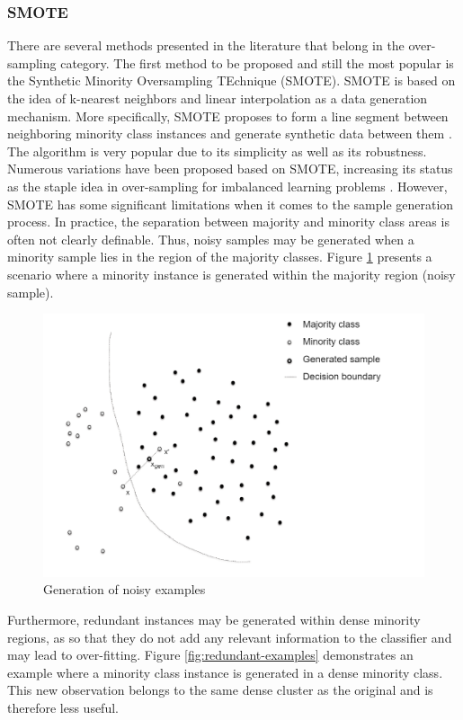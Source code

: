 \documentclass[parskip=full]{scrartcl}
\begin{document}
\subsubsection{SMOTE}

There are several methods presented in the literature that belong in the
over-sampling category. The first method to be  proposed and still the most
popular is the Synthetic Minority Oversampling TEchnique (SMOTE). SMOTE is based
on the idea of k-nearest neighbors and linear interpolation as a data generation
mechanism. More specifically, SMOTE proposes to form a line segment between
neighboring minority class instances and generate synthetic data between them
\cite{Chawla.2002}. The algorithm is very popular due to its simplicity as well
as its robustness. Numerous variations have been proposed based on SMOTE,
increasing its status as the staple idea in over-sampling for imbalanced
learning problems \cite{Fernandez.2018}. However, SMOTE has some significant
limitations when it comes to the sample generation process. In practice, the
separation between majority and minority class areas is often not clearly
definable. Thus, noisy samples may be generated when a minority sample lies in
the region of the majority classes. Figure \ref{fig:noisy-examples} presents a
scenario where a minority instance is generated within the majority region
(noisy sample).

\begin{figure}[H]
	\centering
	\includegraphics[width=0.6\linewidth]{../analysis/noisy_examples.png}
	\caption{Generation of noisy examples \cite{Douzas.2019}}
	\label{fig:noisy-examples}
\end{figure}

Furthermore, redundant instances may be generated within dense minority regions,
as so that they do not add any relevant information to the classifier and may
lead to over-fitting. Figure \ref{fig:redundant-examples} demonstrates an
example where a minority  class instance is generated in a dense minority class.
This new observation belongs to the same dense cluster as the original and is
therefore less useful. 
\end{document}
